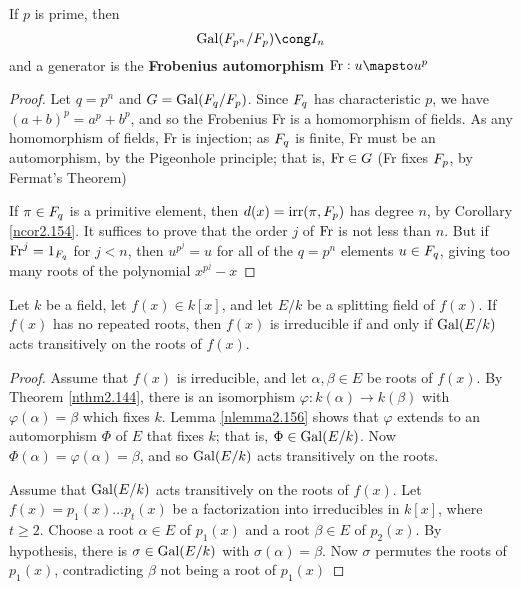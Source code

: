 \documentclass[11pt]{article}
\begin{document}
\begin{theorem}[]
If \(p\) is prime, then
\begin{equation*}
\Gal(\F_{p^n}/\F_p)\cong\I_n
\end{equation*}
and a generator is the \textbf{Frobenius automorphism}  \(\Fr:u\mapsto u^p\)
\end{theorem}

\begin{proof}
Let \(q=p^n\) and \(G=\operatorname{Gal}(\relax{F}_q/\relax{F}_p)\). Since \(\relax{F}_q\) has characteristic
\(p\), we have \((a+b)^p=a^p+b^p\), and so the Frobenius Fr is a homomorphism
of fields. As any homomorphism of fields, Fr is injection; as \(\relax{F}_q\) is
finite, Fr must be an automorphism, by the Pigeonhole principle; that is,
\(\operatorname{Fr}\in G\) (Fr fixes \(\relax{F}_p\), by Fermat's Theorem)

If \(\pi\in\relax{F}_q\) is a primitive element, then \(d(x)=\operatorname{irr}(\pi,\relax{F}_p)\) has
degree \(n\), by Corollary \ref{ncor2.154}. It suffices to prove that the order
\(j\) of \(\operatorname{Fr}\) is not less than \(n\). But if \(\operatorname{Fr}^j=1_{\relax{F}_q}\) for \(j<n\),
then \(u^{p^j}=u\) for all of the \(q=p^n\) elements \(u\in\relax{F}_q\), giving too
many roots of the polynomial \(x^{p^j}-x\)
\end{proof}

\begin{proposition}[]
Let \(k\) be a field, let \(f(x)\in k[x]\), and let \(E/k\) be a splitting
field of \(f(x)\). If \(f(x)\) has no repeated roots, then \(f(x)\) is
irreducible if and only if \(\operatorname{Gal}(E/k)\) acts transitively on the roots of
\(f(x)\). 
\end{proposition}

\begin{proof}
Assume that \(f(x)\) is irreducible, and let \(\alpha,\beta\in E\) be roots of
\(f(x)\). By Theorem \ref{nthm2.144}, there is an isomorphism 
\(\varphi:k(\alpha)\to k(\beta)\) with \(\varphi(\alpha)=\beta\) which fixes \(k\). Lemma \ref{nlemma2.156}
shows that \(\varphi\) extends to an automorphism \(\Phi\) of \(E\) that fixes \(k\); that is,
\(\Phi\in\operatorname{Gal}(E/k)\). Now \(\Phi(\alpha)=\varphi(\alpha)=\beta\), and so \(\operatorname{Gal}(E/k)\)
acts transitively on the roots.

Assume that \(\operatorname{Gal}(E/k)\) acts transitively on the roots of \(f(x)\). Let 
\(f(x)=p_1(x)\dots p_t(x)\) be a factorization into irreducibles in \(k[x]\),
where \(t\ge2\). Choose a root \(\alpha\in E\) of \(p_1(x)\) and a root
\(\beta\in E\) of \(p_2(x)\). By hypothesis, there is \(\sigma\in\operatorname{Gal}(E/k)\)
with \(\sigma(\alpha)=\beta\). Now \(\sigma\) permutes the roots of \(p_1(x)\), contradicting \(\beta\)
not being a root of \(p_1(x)\)
\end{proof}
\end{document}
